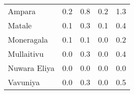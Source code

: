 \begin{tabular}{lrrrr}
Ampara       &            0.2 &                 0.8 &            0.2 &                 1.3 \\
Matale       &            0.1 &                 0.3 &            0.1 &                 0.4 \\
Moneragala   &            0.1 &                 0.1 &            0.0 &                 0.2 \\
Mullaitivu   &            0.0 &                 0.3 &            0.0 &                 0.4 \\
Nuwara Eliya &            0.0 &                 0.0 &            0.0 &                 0.0 \\
Vavuniya     &            0.0 &                 0.3 &            0.0 &                 0.5 \\
\bottomrule
\end{tabular}
